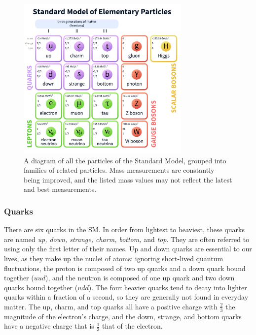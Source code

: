 \begin{figure}[h]
  \centering
  \includegraphics[width=0.75\textwidth]{figures/standard-model-light.pdf}
  \caption%
  {A diagram of all the particles of the Standard Model, grouped into
  families of related particles. Mass measurements are constantly
  being improved, and the listed mass values may not reflect the latest and
  best measurements.}
  \label{fig:standardmodel}
\end{figure}

\subsubsection*{Quarks}
There are six quarks in the SM. In order from lightest to heaviest,
these quarks are named \emph{up, down, strange, charm, bottom,} and
\emph{top}. They are often referred to using only the first letter of
their names. Up and down quarks are essential to our lives, as
they make up the nuclei of atoms: ignoring short-lived quantum
fluctuations, the proton is composed of two up
quarks and a down quark bound together ($uud$), and the neutron is composed of one up
quark and two down quarks bound together ($udd$). The four heavier
quarks tend to decay into lighter quarks within a fraction of a
second, so they are generally not found in everyday matter. The up,
charm, and top quarks all have a positive charge with $\frac{2}{3}$ the
magnitude of the electron's charge, and the down, strange, and bottom
quarks have a negative charge that is $\frac{1}{3}$ that of the electron.

